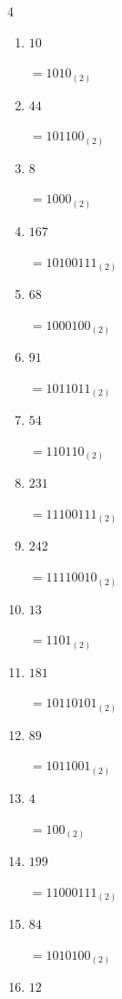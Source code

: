 \begin{multicols}{4}
\begin{enumerate}
        $=10111000_{(2)}$

  \item $10$

        $=1010_{(2)}$

  \item $44$

        $=101100_{(2)}$

  \item $8$

        $=1000_{(2)}$

  \item $167$

        $=10100111_{(2)}$

  \item $68$

        $=1000100_{(2)}$

\columnbreak %

\resetques

  \item $91$

        $=1011011_{(2)}$

  \item $54$

        $=110110_{(2)}$

  \item $231$

        $=11100111_{(2)}$

  \item $242$

        $=11110010_{(2)}$

  \item $13$

        $=1101_{(2)}$

  \item $181$

        $=10110101_{(2)}$

  \item $89$

        $=1011001_{(2)}$

  \item $4$

        $=100_{(2)}$

  \item $199$

        $=11000111_{(2)}$

  \item $84$

        $=1010100_{(2)}$

  \item $12$


\end{enumerate}
\end{multicols}
